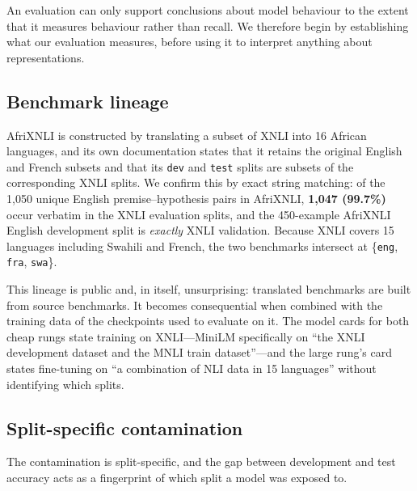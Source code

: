 \documentclass[11pt]{article}
\newcommand{\claim}[1]{#1}   %
\begin{document}
An evaluation can only support conclusions about model behaviour to the extent
that it measures behaviour rather than recall. We therefore begin by establishing
what our evaluation measures, before using it to interpret anything about
representations.

\subsection{Benchmark lineage}

AfriXNLI is constructed by translating a subset of XNLI into 16 African
languages, and its own documentation states that it retains the original English
and French subsets and that its \texttt{dev} and \texttt{test} splits are subsets
of the corresponding XNLI splits. We confirm this by exact string matching: of
the 1{,}050 unique English premise--hypothesis pairs in AfriXNLI, \textbf{1{,}047
(99.7\%)} occur verbatim in the XNLI evaluation splits, and the 450-example
AfriXNLI English development split is \emph{exactly} XNLI validation. Because
XNLI covers 15 languages including Swahili and French, the two benchmarks
intersect at \{\texttt{eng}, \texttt{fra}, \texttt{swa}\}.

This lineage is public and, in itself, unsurprising: translated benchmarks are
built from source benchmarks. It becomes consequential when combined with the
training data of the checkpoints used to evaluate on it. The model cards for both
cheap rungs state training on XNLI---MiniLM specifically on ``the XNLI
development dataset and the MNLI train dataset''---and the large rung's card
states fine-tuning on ``a combination of NLI data in 15 languages'' without
identifying which splits.

\subsection{Split-specific contamination}

\claim{The contamination is split-specific, and the gap between development and
test accuracy acts as a fingerprint of which split a model was exposed to.}
\end{document}
